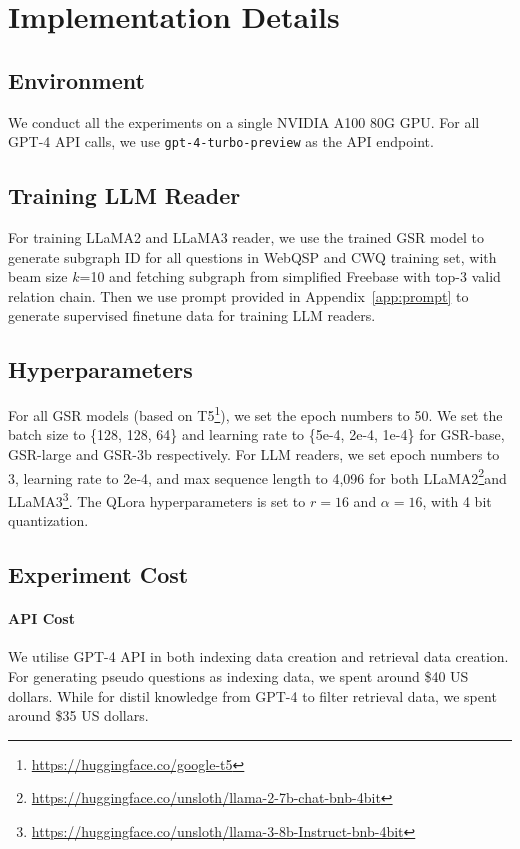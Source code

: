 \documentclass[11pt]{article}
\begin{document}


\appendix

\section{Implementation Details}
\label{app:implementation}
\subsection{Environment}
We conduct all the experiments on a single NVIDIA A100 80G GPU. For all GPT-4 API calls, we use \texttt{gpt-4-turbo-preview} as the API endpoint. 
\subsection{Training LLM Reader}
For training LLaMA2 and LLaMA3 reader, we use the trained GSR model to generate subgraph ID for all questions in WebQSP and CWQ training set, with beam size $k$=10 and fetching subgraph from simplified Freebase with top-3 valid relation chain. Then we use prompt provided in Appendix~\ref{app:prompt} to generate supervised finetune data for training LLM readers.
\subsection{Hyperparameters}
For all GSR models (based on T5\footnote{\url{https://huggingface.co/google-t5}}), we set the epoch numbers to 50. We set the batch size to \{128, 128, 64\} and learning rate to \{5e-4, 2e-4, 1e-4\} for GSR-base, GSR-large and GSR-3b respectively. For LLM readers, we set epoch numbers to 3, learning rate to 2e-4, and max sequence length to 4,096 for both LLaMA2\footnote{\url{https://huggingface.co/unsloth/llama-2-7b-chat-bnb-4bit}}and LLaMA3\footnote{\url{https://huggingface.co/unsloth/llama-3-8b-Instruct-bnb-4bit}}. The QLora hyperparameters is set to $r=16$ and $\alpha=16$, with 4 bit quantization.
\subsection{Experiment Cost}
\paragraph{API Cost}
We utilise GPT-4 API in both indexing data creation and retrieval data creation. For generating pseudo questions as indexing data, we spent around \$40 US dollars. While for distil knowledge from GPT-4 to filter retrieval data, we spent around \$35 US dollars. 
\end{document}

